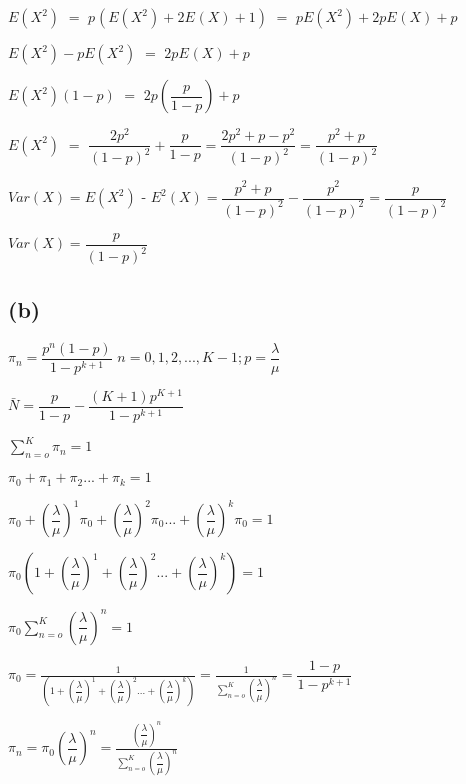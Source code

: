 \documentclass[12pt]{article}
\begin{document}
   \(\displaystyle E \left({X^2}\right)\) \(=\) \(\displaystyle p^{} \left( E \left({X^{2}}\right) +2 E^{} \left({X}\right) + 1\right) \)  \(=\) \(\displaystyle   pE \left({X^{2}}\right) +2pE^{} \left({X}\right) + p \)   

   \(\displaystyle E \left({X^2}\right) - pE \left({X^{2}}\right)\) \(=\) \(\displaystyle 2pE^{} \left({X}\right) + p \)   

   \(\displaystyle E \left({X^2}\right)(1-p)\) \(=\) \(\displaystyle 2p(\dfrac p {1-p}) + p \)   

   \(\displaystyle E \left({X^2}\right)\) \(=\) \(\displaystyle \dfrac {2p^2} {{(1-p)}^2} + \dfrac {p} {1-p} = \dfrac {2p^2 + p - p^2} {{(1-p)}^2} = \dfrac {p^2 + p} {{(1-p)}^2}  \)   

   \(\displaystyle Var\left({X}\right) = E \left({X^{2}}\right)\) - \(\displaystyle E^{2} \left({X}\right) =  \dfrac {p^2 + p} {{(1-p)}^2} -  \dfrac {p^2} {{(1-p)}^2} =  \dfrac { p} {{(1-p)}^2} \)   

   \(\displaystyle Var\left({X}\right) =  \dfrac { p} {{(1-p)}^2} \)   


   
     \pagebreak
   
   
   
   
  \subsection*{(b)} 

$ \pi_n =  \dfrac {p^n(1-p)} {1-p^{k+1}}$  $n=0,1,2,...,K-1;  p= \dfrac \lambda \mu$

$\bar{N} = \dfrac {p} {1-p} - \dfrac {(K+1)p^{K+1}} {1-p^{k+1}}$

$ \displaystyle \sum_{n = o}^{K}  \pi_n = 1$

$ \pi_0 +\pi_1 +\pi_2... +\pi_k  =  1$

$ \pi_0 +(\dfrac \lambda \mu)^1\pi_0 +(\dfrac \lambda \mu)^2\pi_0... +(\dfrac \lambda \mu)^k\pi_0  =  1$

$ \pi_0(1 +(\dfrac \lambda \mu)^1 +(\dfrac \lambda \mu)^2... +(\dfrac \lambda \mu)^k)  =  1$

$ \pi_0  \displaystyle \sum_{n = o}^{K} (\dfrac \lambda \mu)^n  =  1$

$ \pi_0 = \frac 1 {(1 +(\dfrac \lambda \mu)^1 +(\dfrac \lambda \mu)^2... +(\dfrac \lambda \mu)^k)} =  \frac 1 {\displaystyle \sum_{n = o}^{K} (\dfrac \lambda \mu)^n} = \dfrac {1-p} {1-p^{k+1}}$

$ \pi_n = \pi_0 (\dfrac \lambda \mu)^n = \frac { (\dfrac \lambda \mu)^n} {\displaystyle \sum_{n = o}^{K} (\dfrac \lambda \mu)^n} $  
\end{document}
